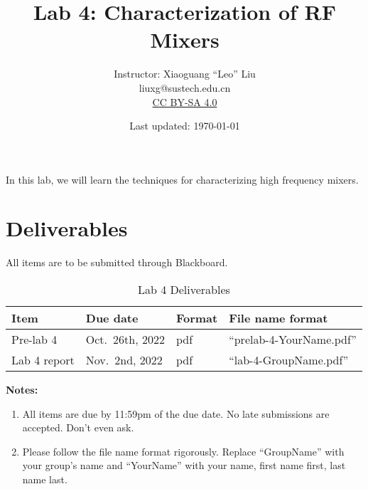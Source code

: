 \documentclass[letterpaper, 11pt]{article}
\begin{document}
\title{Lab 4: Characterization of RF Mixers}
\author{Instructor: Xiaoguang ``Leo'' Liu\\liuxg@sustech.edu.cn \\
	\small \href{http://creativecommons.org/licenses/by-sa/4.0/}{CC BY-SA 4.0}}
\date{Last updated: \today}

\maketitle

In this lab, we will learn the techniques for characterizing high frequency mixers. 

%



\section{Deliverables}
All items are to be submitted through Blackboard.  

\vspace{0.5cm}

\begin{table}[h]
	\footnotesize
	\caption{Lab 4 Deliverables}
	\renewcommand{\arraystretch}{1.2}
	\begin{tabular}{m{1in} l m{0.45in} m{2in}|}
		\toprule
		\textbf{Item} & \textbf{Due date} & \textbf{Format} & \textbf{File name format} \\
		\midrule
		Pre-lab 4 & Oct.~26th, 2022 & pdf & ``prelab-4-YourName.pdf''\\
		Lab 4 report & Nov.~2nd, 2022 & pdf & ``lab-4-GroupName.pdf''\\
		\bottomrule
	\end{tabular}
	\label{tab:deliverables}
\end{table}

\textbf{Notes:}
\begin{enumerate}
	\item All items are due by 11:59pm of the due date. No late submissions are accepted. Don't even ask. 
	
	\item Please follow the file name format rigorously. Replace ``GroupName'' with your group's name and ``YourName'' with your name, first name first, last name last. 
\end{enumerate}
\end{document}

